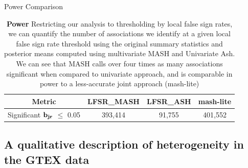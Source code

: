 \begin{table}[ht]
\caption{Power Comparison}
\centering
\begin{tabular}{c c c c}
\hline\hline
Metric & LFSR_{MASH} & LFSR_{ASH}&mash-lite \\ [0.5ex] %
\hline
Significant $\bf{b}_{jr}$ $\leq$ 0.05%
&393,414 & 91,755&401,552\\
\hline
\end{tabular}
\caption{\textbf{Power} Restricting our analysis to thresholding by local false sign rates, we can quantify the number of associations we identify at a given local false sign rate threshold using the original summary statistics and posterior means computed using multivariate MASH and Univariate Ash. We can see that MASH calls over four times as many associations significant when compared to univariate approach, and is comparable in power to a less-accurate joint approach (mash-lite)}
\label{table:power}
\end{table}\newline




\subsection{A qualitative description of heterogeneity in the GTEX data}

